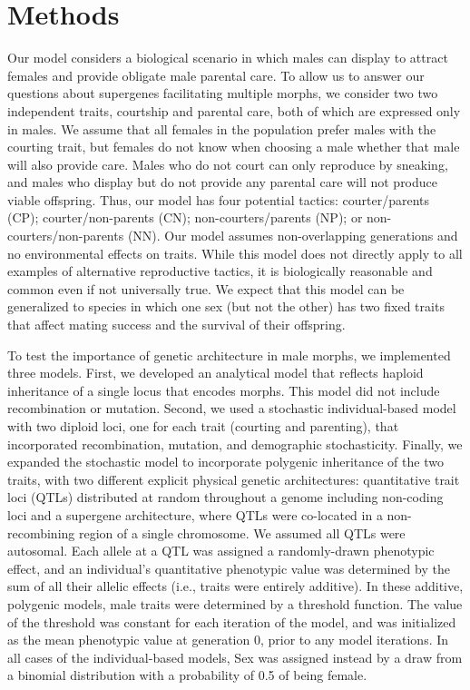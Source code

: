 \documentclass[
  11pt,
  a4paper,
]{article}
\begin{document}
\hypertarget{methods}{%
\section{Methods}\label{methods}}

Our model considers a biological scenario in which males can display to
attract females and provide obligate male parental care. To allow us to
answer our questions about supergenes facilitating multiple morphs, we
consider two two independent traits, courtship and parental care, both
of which are expressed only in males. We assume that all females in the
population prefer males with the courting trait, but females do not know
when choosing a male whether that male will also provide care. Males who
do not court can only reproduce by sneaking, and males who display but
do not provide any parental care will not produce viable offspring.
Thus, our model has four potential tactics: courter/parents (CP);
courter/non-parents (CN); non-courters/parents (NP); or
non-courters/non-parents (NN). Our model assumes non-overlapping
generations and no environmental effects on traits. While this model
does not directly apply to all examples of alternative reproductive
tactics, it is biologically reasonable and common even if not
universally true. We expect that this model can be generalized to
species in which one sex (but not the other) has two fixed traits that
affect mating success and the survival of their offspring.

To test the importance of genetic architecture in male morphs, we
implemented three models. First, we developed an analytical model that
reflects haploid inheritance of a single locus that encodes morphs. This
model did not include recombination or mutation. Second, we used a
stochastic individual-based model with two diploid loci, one for each
trait (courting and parenting), that incorporated recombination,
mutation, and demographic stochasticity. Finally, we expanded the
stochastic model to incorporate polygenic inheritance of the two traits,
with two different explicit physical genetic architectures: quantitative
trait loci (QTLs) distributed at random throughout a genome including
non-coding loci and a supergene architecture, where QTLs were co-located
in a non-recombining region of a single chromosome. We assumed all QTLs
were autosomal. Each allele at a QTL was assigned a randomly-drawn
phenotypic effect, and an individual's quantitative phenotypic value was
determined by the sum of all their allelic effects (i.e., traits were
entirely additive). In these additive, polygenic models, male traits
were determined by a threshold function. The value of the threshold was
constant for each iteration of the model, and was initialized as the
mean phenotypic value at generation 0, prior to any model iterations. In
all cases of the individual-based models, Sex was assigned instead by a
draw from a binomial distribution with a probability of 0.5 of being
female.
\end{document}

